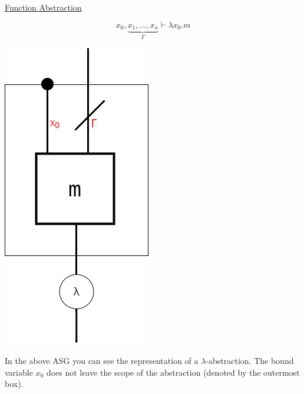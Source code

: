\documentclass{article}
\renewcommand{\u}[1]{\underline{#1}}
\begin{document}
\u{Function Abstraction}

\[
    x_0,\underbrace{x_1,\ldots,x_n}_\Gamma \vdash \lambda x_0.m
\]

\begin{center}
    \includegraphics[width=0.3\linewidth]{ASGAbstraction.png}
\end{center}

In the above ASG you can see the representation of a $\lambda$-abstraction. The bound variable $x_0$ does not leave the scope of the abstraction (denoted by the outermost box).
\end{document}
